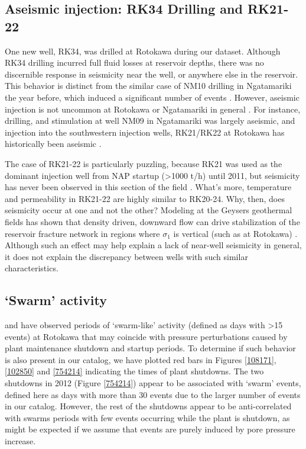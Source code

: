 \subsection{Aseismic injection: RK34 Drilling and RK21-22}
One new well, RK34, was drilled at Rotokawa during our dataset. Although RK34 drilling incurred full fluid losses at reservoir depths, there was no discernible response in seismicity near the well, or anywhere else in the reservoir. This behavior is distinct from the similar case of NM10 drilling in Ngatamariki the year before, which induced a significant number of events \citep{j2019}. However, aseismic injection is not uncommon at Rotokawa or Ngatamariki in general \citep{Sewell_2015WGC}. For instance, drilling, and stimulation at well NM09 in Ngatamariki was largely aseismic, and injection into the southwestern injection wells, RK21/RK22 at Rotokawa has historically been aseismic \citep{j2019,Sewell_2015WGC}.

The case of RK21-22 is particularly puzzling, because RK21 was used as the dominant injection well from NAP startup (\textgreater1000 t/h) until 2011, but seismicity has never been observed in this section of the field \citep{Sewell_2015WGC}. What's more, temperature and permeability in RK21-22 are highly similar to RK20-24. Why, then, does seismicity occur at one and not the other? Modeling at the Geysers geothermal fields has shown that density driven, downward flow can drive stabilization of the reservoir fracture network in regions where $\sigma_{1}$ is vertical (such as at Rotokawa) \citep{Jeanne_2015tensor}. Although such an effect may help explain a lack of near-well seismicity in general, it does not explain the discrepancy between wells with such similar characteristics.

\subsection{`Swarm' activity}
\citet{Sewell_2015WGC} and \citet{Sherburn_2015} have observed periods of `swarm-like' activity (defined as days with \textgreater15 events) at Rotokawa that may coincide with pressure perturbations caused by plant maintenance shutdown and startup periods. To determine if such behavior is also present in our catalog, we have plotted red bars in Figures \ref{108171}, \ref{102850} and \ref{754214} indicating the times of plant shutdowns. The two shutdowns in 2012 (Figure \ref{754214}) appear to be associated with `swarm' events, defined here as days with more than 30 events due to the larger number of events in our catalog. However, the rest of the shutdowns appear to be anti-correlated with swarms periods with few events occurring while the plant is shutdown, as might be expected if we assume that events are purely induced by pore pressure increase.

